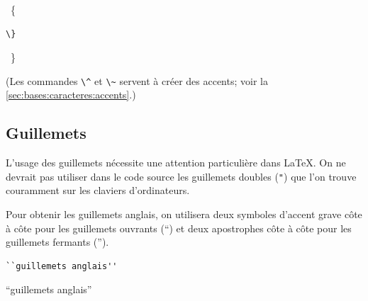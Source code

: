 {\begin{demo}
\begin{minipage}{0.15\linewidth}
\begin{texample}
      \producing\ \{
    \end{texample}
  \end{minipage}
  \hfill
  \begin{minipage}{0.15\linewidth}
    \begin{texample}
\begin{lstlisting}
\}
\end{lstlisting}
      \producing\ \}
    \end{texample}
  \end{minipage}
  \hfill
  \begin{minipage}{0.15\linewidth}
    \mbox{}
  \end{minipage}
  \hfill
\end{demo}
(Les commandes \verb=\^= et \verb=\~= servent à créer des accents;
voir la \autoref{sec:bases:caracteres:accents}.)

\subsection{Guillemets}
\label{sec:bases:caracteres:guillemets}

L'usage des guillemets nécessite une attention particulière dans
{\LaTeX}. On ne devrait pas utiliser dans le code source les
guillemets doubles (\verb="=) que l'on trouve couramment sur les
claviers d'ordinateurs.

Pour obtenir les guillemets anglais, on utilisera deux symboles
d'accent grave côte à côte pour les guillemets ouvrants (``) et deux
apostrophes côte à côte pour les guillemets fermants ('').
\begin{demo}
  \begin{texample}
\begin{lstlisting}[escapeinside={}]
``guillemets anglais''
\end{lstlisting}
    \producing
    ``guillemets anglais''
  \end{texample}
\end{demo}

}

